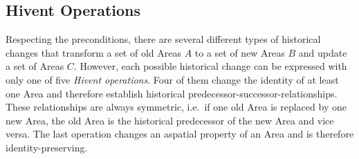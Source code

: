 
\subsection{Hivent Operations} %
\label{sub:hivent_operations}

Respecting the preconditions, there are several different types of historical changes that transform a set of old Areas $A$ to a set of new Areas $B$ and update a set of Areas $C$. However, each possible historical change can be expressed with only one of five \emph{Hivent operations}. Four of them change the identity of at least one Area and therefore establish historical predecessor-successor-relationships. These relationships are always symmetric, i.e.\ if one old Area is replaced by one new Area, the old Area is the historical predecessor of the new Area and vice versa. The last operation changes an aspatial property of an Area and is therefore identity-preserving.


